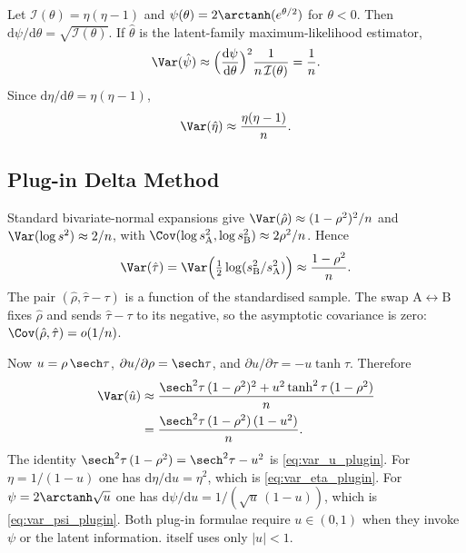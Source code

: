 Let $\mathcal{I}(\theta) = \eta(\eta-1)$ and $\psi(\theta) = 2\arctanh(e^{\theta/2})$ for $\theta<0$.
Then $\mathrm{d}\psi/\mathrm{d}\theta = \sqrt{\mathcal{I}(\theta)}$.
If $\hat\theta$ is the latent-family maximum-likelihood estimator,
\[
  \Var(\hat\psi)
  \approx \Bigl(\frac{\mathrm{d}\psi}{\mathrm{d}\theta}\Bigr)^{2}\frac{1}{n\,\mathcal{I}(\theta)}
  = \frac{1}{n}.
\]
Since $\mathrm{d}\eta/\mathrm{d}\theta = \eta(\eta-1)$,
\[
  \Var(\hat\eta) \approx \frac{\eta(\eta-1)}{n}.
\]

\subsection{Plug-in Delta Method}
\label{sec:appendix_plugin}

Standard bivariate-normal expansions give $\Var(\hat\rho)\approx(1-\rho^{2})^{2}/n$ and $\Var(\log s^{2})\approx 2/n$, with $\Cov(\log s_{\mathrm{A}}^{2},\log s_{\mathrm{B}}^{2})\approx 2\rho^{2}/n$.
Hence
\[
  \Var(\hat\tau)
  = \Var\Bigl(\tfrac{1}{2}\log(s_{\mathrm{B}}^{2}/s_{\mathrm{A}}^{2})\Bigr)
  \approx \frac{1-\rho^{2}}{n}.
\]
The pair $(\hat\rho,\hat\tau-\tau)$ is a function of the standardised sample.
The swap $\mathrm{A}\leftrightarrow\mathrm{B}$ fixes $\hat\rho$ and sends $\hat\tau-\tau$ to its negative, so the asymptotic covariance is zero: $\Cov(\hat\rho,\hat\tau) = o(1/n)$.

Now $u = \rho\,\sech\tau$, $\partial u/\partial\rho = \sech\tau$, and $\partial u/\partial\tau = -u\tanh\tau$.
Therefore
\begin{align*}
  \Var(\hat u)
  &\approx \frac{\sech^{2}\tau\,(1-\rho^{2})^{2} + u^{2}\tanh^{2}\tau\,(1-\rho^{2})}{n}\\
  &= \frac{\sech^{2}\tau\,(1-\rho^{2})\,(1-u^{2})}{n}.
\end{align*}
The identity $\sech^{2}\tau\,(1-\rho^{2}) = \sech^{2}\tau-u^{2}$ is \cref{eq:var_u_plugin}.
For $\eta = 1/(1-u)$ one has $\mathrm{d}\eta/\mathrm{d}u = \eta^{2}$, which is \cref{eq:var_eta_plugin}.
For $\psi = 2\arctanh\sqrt{u}$ one has $\mathrm{d}\psi/\mathrm{d}u = 1/(\sqrt{u}\,(1-u))$, which is \cref{eq:var_psi_plugin}.
Both plug-in formulae require $u\in(0,1)$ when they invoke $\psi$ or the latent information.
 itself uses only $|u|<1$.
